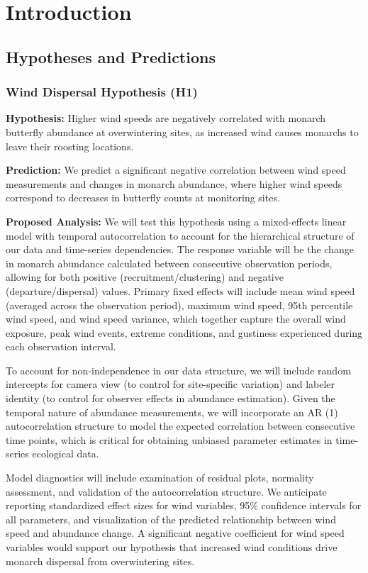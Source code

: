 \chapter{Introduction}
\label{ch:introduction}

\section{Hypotheses and Predictions}

\subsection{Wind Dispersal Hypothesis (H1)}

\textbf{Hypothesis:} Higher wind speeds are negatively correlated with monarch butterfly abundance at overwintering sites, as increased wind causes monarchs to leave their roosting locations.

\textbf{Prediction:} We predict a significant negative correlation between wind speed measurements and changes in monarch abundance, where higher wind speeds correspond to decreases in butterfly counts at monitoring sites.

\textbf{Proposed Analysis:}
We will test this hypothesis using a mixed-effects linear model with temporal autocorrelation to account for the hierarchical structure of our data and time-series dependencies. The response variable will be the change in monarch abundance calculated between consecutive observation periods, allowing for both positive (recruitment/clustering) and negative (departure/dispersal) values. Primary fixed effects will include mean wind speed (averaged across the observation period), maximum wind speed, 95th percentile wind speed, and wind speed variance, which together capture the overall wind exposure, peak wind events, extreme conditions, and gustiness experienced during each observation interval. 

To account for non-independence in our data structure, we will include random intercepts for camera view (to control for site-specific variation) and labeler identity (to control for observer effects in abundance estimation). Given the temporal nature of abundance measurements, we will incorporate an AR (1) autocorrelation structure to model the expected correlation between consecutive time points, which is critical for obtaining unbiased parameter estimates in time-series ecological data.

Model diagnostics will include examination of residual plots, normality assessment, and validation of the autocorrelation structure. We anticipate reporting standardized effect sizes for wind variables, 95\% confidence intervals for all parameters, and visualization of the predicted relationship between wind speed and abundance change. A significant negative coefficient for wind speed variables would support our hypothesis that increased wind conditions drive monarch dispersal from overwintering sites.


